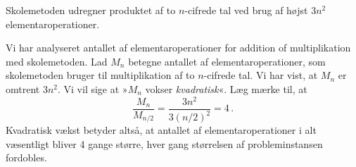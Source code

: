 \begin{thm}
  Skolemetoden udregner produktet af to $n$-cifrede tal ved brug af højst $3n^2$ elementaroperationer.
\end{thm}

Vi har analyseret antallet af elementaroperationer for addition of multiplikation med skolemetoden.
Lad $M_n$ betegne antallet af elementaroperationer, som skolemetoden bruger til multiplikation af to $n$-cifrede tal.
Vi har vist, at $M_n$ er omtrent $3n^2$.
Vi vil sige at »$M_n$ vokser \emph{kvadratisk}«.
Læg mærke til, at 
\[ \frac{M_n}{M_{n/2}} = \frac{3 n^2}{3 (n/2)^2} =  4 \,.\]
Kvadratisk vækst betyder altså, at antallet af elementaroperationer i alt væsentligt bliver 4 gange større, hver gang størrelsen af probleminstansen
fordobles. 


